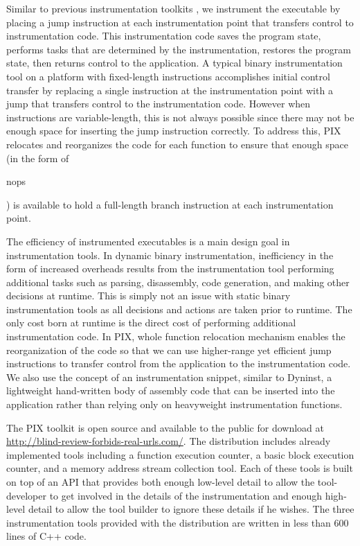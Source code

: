 Similar to previous instrumentation toolkits \cite{buck2000api}, we instrument the executable 
by placing a jump instruction at each instrumentation
point that transfers control to instrumentation code. This instrumentation code saves the
program state, performs tasks that are determined by the instrumentation,
restores the program state, then returns control to the application.
A typical binary instrumentation tool on a platform with fixed-length instructions 
\cite{tikir2006pmac} accomplishes initial control transfer by replacing a
single instruction at the instrumentation point with a jump that transfers
control to the instrumentation code. However when instructions are variable-length,
this is not always possible since there may not be enough space for 
inserting the jump instruction correctly. To address this, PIX
relocates and reorganizes the code for each function to ensure that enough
space (in the form of \begin{it}nops\end{it}) is available to hold a full-length branch instruction at each
instrumentation point.

The efficiency of instrumented executables is a main design goal in instrumentation tools. In dynamic binary instrumentation,
inefficiency in the form of increased overheads results from the instrumentation tool performing additional tasks such 
as parsing, disassembly, code generation, and making other decisions at runtime. This
is simply not an issue with static binary instrumentation tools as all
decisions and actions are taken prior to runtime. The only cost born at runtime is the direct
cost of performing additional  instrumentation code. In PIX, whole function relocation mechanism
enables the reorganization of the code so that we
can use higher-range yet efficient jump instructions to transfer control from the
application to the instrumentation code. We also use the concept of an
instrumentation snippet, similar to Dyninst, a lightweight hand-written body of assembly code that can
be inserted into the application rather than relying only on heavyweight
instrumentation functions.

The PIX toolkit is open source and available to the public for download 
at \url{http://blind-review-forbids-real-urls.com/}. The distribution includes already implemented tools 
including a function execution counter, a basic block
execution counter, and a memory address stream collection tool. Each of these tools is built on top of
an API that provides both enough low-level detail to allow the tool-developer to get involved in the 
details of the instrumentation and enough high-level detail to allow the tool builder
to ignore these details if he wishes. The three instrumentation tools provided with the distribution are written in
less than 600 lines of C++ code.

